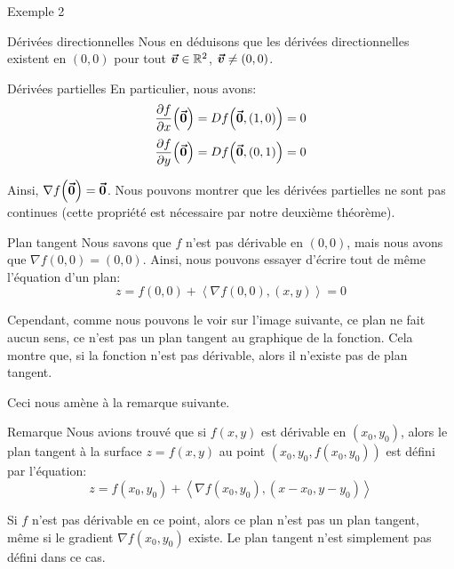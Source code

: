 \documentclass[a4paper]{article}
\begin{document}
\begin{parag}{Exemple 2}
\begin{subparag}{Dérivées directionnelles}
        Nous en déduisons que les dérivées directionnelles existent en $\left(0, 0\right)$ pour tout $\bm{\protect\vec{v}} \in \mathbb{R}^2$, $\bvec{v} \neq \left(0, 0\right)$.
    \end{subparag}

    \begin{subparag}{Dérivées partielles}
        En particulier, nous avons: 
        \[\frac{\partial f}{\partial x}\left(\bvec{0}\right) = Df\left(\bvec{0}, \left(1, 0\right)\right) = 0\] 
        \[\frac{\partial f}{\partial y}\left(\bvec{0}\right) = Df\left(\bvec{0}, \left(0, 1\right)\right) = 0\]
        
        Ainsi, $\nabla f\left(\bvec{0}\right) = \bvec{0}$. Nous pouvons montrer que les dérivées partielles ne sont pas continues (cette propriété est nécessaire par notre deuxième théorème).
    \end{subparag}

    \begin{subparag}{Plan tangent}
        Nous savons que $f$ n'est pas dérivable en $\left(0, 0\right)$, mais nous avons que $\nabla f\left(0, 0\right) = \left(0, 0\right)$. Ainsi, nous pouvons essayer d'écrire tout de même l'équation d'un plan: 
        \[z = f\left(0, 0\right) + \left<\nabla f\left(0, 0\right), \left(x, y\right)\right> = 0\]
        
        Cependant, comme nous pouvons le voir sur l'image suivante, ce plan ne fait aucun sens, ce n'est pas un plan tangent au graphique de la fonction. Cela montre que, si la fonction n'est pas dérivable, alors il n'existe pas de plan tangent.
        
        Ceci nous amène à la remarque suivante.
    \end{subparag}
\end{parag}

\begin{parag}{Remarque}
    Nous avions trouvé que si $f\left(x, y\right)$ est dérivable en $\left(x_0, y_0\right)$, alors le plan tangent à la surface $z = f\left(x, y\right)$ au point $\left(x_0, y_0, f\left(x_0, y_0\right)\right)$ est défini par l'équation: 
    \[z = f\left(x_0, y_0\right) + \left<\nabla f\left(x_0, y_0\right), \left(x - x_0, y - y_0\right)\right>\]
    
    Si $f$ n'est pas dérivable en ce point, alors ce plan n'est pas un plan tangent, même si le gradient $\nabla f\left(x_0, y_0\right)$ existe. Le plan tangent n'est simplement pas défini dans ce cas.
\end{parag}
\end{document}
